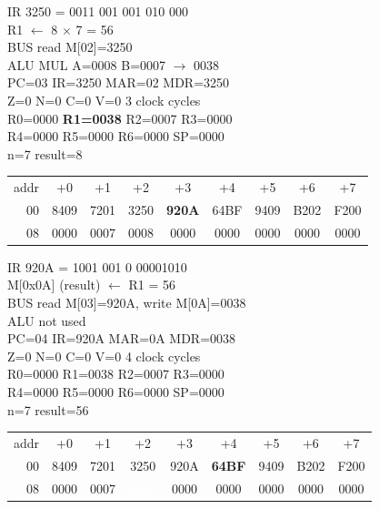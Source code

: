 \noindent\begin{tcolorbox}[stepbox, title={Step 8 \hfill PC 02 \quad MUL R1, R1, R2}]
\textcolor{dim}{IR} 3250 = 0011 001 001 010 000\\
R1 $\leftarrow$ 8 $\times$ 7 = 56\\
\textcolor{dim}{BUS} read M[02]=3250\\
\textcolor{dim}{ALU} MUL A=0008 B=0007 $\rightarrow$ 0038\\
PC=03 IR=3250 MAR=02 MDR=3250\\
Z=0 N=0 C=0 V=0 \hfill \textcolor{dim}{3 clock cycles}\\
R0=0000 \textcolor{wrt}{\textbf{R1=0038}} R2=0007 R3=0000\\
R4=0000 R5=0000 R6=0000 SP=0000\\
\textcolor{dim}{n=7  result=8}\\[1pt]
{\setlength{\tabcolsep}{1.6pt}\begin{tabular}{@{}r*{8}{c}@{}}
\textcolor{dim}{addr} & \textcolor{dim}{+0} & \textcolor{dim}{+1} & \textcolor{dim}{+2} & \textcolor{dim}{+3} & \textcolor{dim}{+4} & \textcolor{dim}{+5} & \textcolor{dim}{+6} & \textcolor{dim}{+7}\\
\textcolor{dim}{00} & 8409 & 7201 & 3250 & \cellcolor{pcc}\textbf{920A} & 64BF & 9409 & B202 & F200\\
\textcolor{dim}{08} & 0000 & \cellcolor{datac}0007 & \cellcolor{datac}0008 & 0000 & 0000 & 0000 & 0000 & 0000\\
\end{tabular}}
\end{tcolorbox}\hfill\begin{tcolorbox}[stepbox, title={Step 9 \hfill PC 03 \quad ST R1, result}]
\textcolor{dim}{IR} 920A = 1001 001 0 00001010\\
M[0x0A] (result) $\leftarrow$ R1 = 56\\
\textcolor{dim}{BUS} read M[03]=920A, \textcolor{wrt}{write M[0A]=0038}\\
\textcolor{dim}{ALU} \textcolor{dim}{not used}\\
PC=04 IR=920A MAR=0A MDR=0038\\
Z=0 N=0 C=0 V=0 \hfill \textcolor{dim}{4 clock cycles}\\
R0=0000 R1=0038 R2=0007 R3=0000\\
R4=0000 R5=0000 R6=0000 SP=0000\\
\textcolor{dim}{n=7  result=56}\\[1pt]
{\setlength{\tabcolsep}{1.6pt}\begin{tabular}{@{}r*{8}{c}@{}}
\textcolor{dim}{addr} & \textcolor{dim}{+0} & \textcolor{dim}{+1} & \textcolor{dim}{+2} & \textcolor{dim}{+3} & \textcolor{dim}{+4} & \textcolor{dim}{+5} & \textcolor{dim}{+6} & \textcolor{dim}{+7}\\
\textcolor{dim}{00} & 8409 & 7201 & 3250 & 920A & \cellcolor{pcc}\textbf{64BF} & 9409 & B202 & F200\\
\textcolor{dim}{08} & 0000 & \cellcolor{datac}0007 & \cellcolor{wrt}\textcolor{white}{\textbf{0038}} & 0000 & 0000 & 0000 & 0000 & 0000\\
\end{tabular}}
\end{tcolorbox}\par\vspace{3pt}
